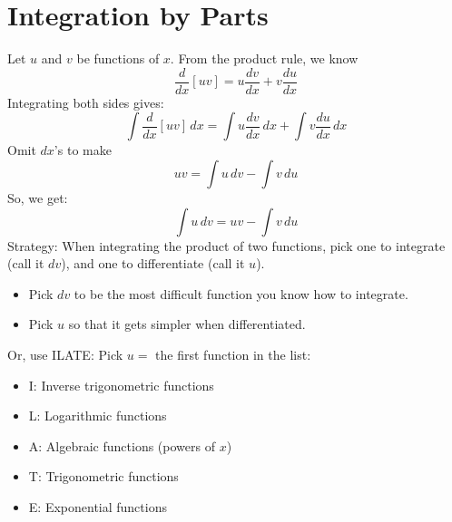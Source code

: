\section{Integration by Parts}
Let $ u $ and $ v $ be functions of $ x $. From the product rule, we know
\[ \frac{d}{dx}[uv]=u \frac{dv}{dx}+v \frac{du}{dx} \]
Integrating both sides gives:
\[ \int \frac{d}{dx} [uv]\, d{x}=\int u \frac{dv}{dx} \, d{x}+
    \int v \frac{du}{dx} \, d{x}   \]
Omit $ dx $'s to make
\[ uv=\int u\, {dv} -\int v\, d{u} \]
So, we get:
\[ \boxed{\int u\, d{v} =uv-\int v\, d{u}} \]
Strategy: When integrating the product of two functions, pick one to
integrate (call it $ dv $), and one to differentiate (call it $ u $).
\begin{itemize}
    \item Pick $ dv $ to be the most difficult function you know how to integrate.
    \item Pick $ u $ so that it gets simpler when differentiated.
\end{itemize}
Or, use ILATE\@: Pick $ u= $ the first function in the list:
\begin{itemize}
    \item I\@: Inverse trigonometric functions
    \item L\@: Logarithmic functions
    \item A\@: Algebraic functions (powers of $ x $)
    \item T\@: Trigonometric functions
    \item E\@: Exponential functions
\end{itemize}

